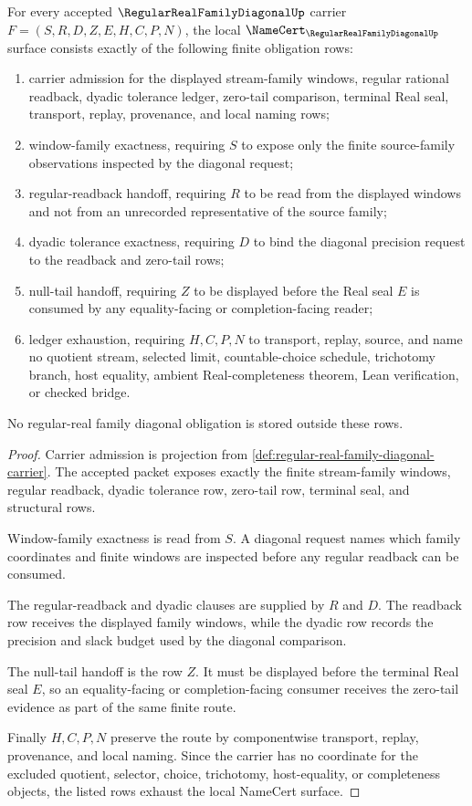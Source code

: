 \begin{theorem}
\label{thm:regular-real-family-diagonal-namecert-obligations}
For every accepted $\RegularRealFamilyDiagonalUp$ carrier $F=(S,R,D,Z,E,H,C,P,N)$, the local $\NameCert_{\RegularRealFamilyDiagonalUp}$ surface consists exactly of the following finite obligation rows:
\begin{enumerate}
\item carrier admission for the displayed stream-family windows, regular rational readback, dyadic tolerance ledger, zero-tail comparison, terminal Real seal, transport, replay, provenance, and local naming rows;
\item window-family exactness, requiring $S$ to expose only the finite source-family observations inspected by the diagonal request;
\item regular-readback handoff, requiring $R$ to be read from the displayed windows and not from an unrecorded representative of the source family;
\item dyadic tolerance exactness, requiring $D$ to bind the diagonal precision request to the readback and zero-tail rows;
\item null-tail handoff, requiring $Z$ to be displayed before the Real seal $E$ is consumed by any equality-facing or completion-facing reader;
\item ledger exhaustion, requiring $H,C,P,N$ to transport, replay, source, and name no quotient stream, selected limit, countable-choice schedule, trichotomy branch, host equality, ambient Real-completeness theorem, Lean verification, or checked bridge.
\end{enumerate}
No regular-real family diagonal obligation is stored outside these rows.
\end{theorem}
\begin{proof}
Carrier admission is projection from \autoref{def:regular-real-family-diagonal-carrier}. The accepted packet exposes exactly the finite stream-family windows, regular readback, dyadic tolerance row, zero-tail row, terminal seal, and structural rows.

Window-family exactness is read from $S$. A diagonal request names which family coordinates and finite windows are inspected before any regular readback can be consumed.

The regular-readback and dyadic clauses are supplied by $R$ and $D$. The readback row receives the displayed family windows, while the dyadic row records the precision and slack budget used by the diagonal comparison.

The null-tail handoff is the row $Z$. It must be displayed before the terminal Real seal $E$, so an equality-facing or completion-facing consumer receives the zero-tail evidence as part of the same finite route.

Finally $H,C,P,N$ preserve the route by componentwise transport, replay, provenance, and local naming. Since the carrier has no coordinate for the excluded quotient, selector, choice, trichotomy, host-equality, or completeness objects, the listed rows exhaust the local NameCert surface.
\end{proof}

